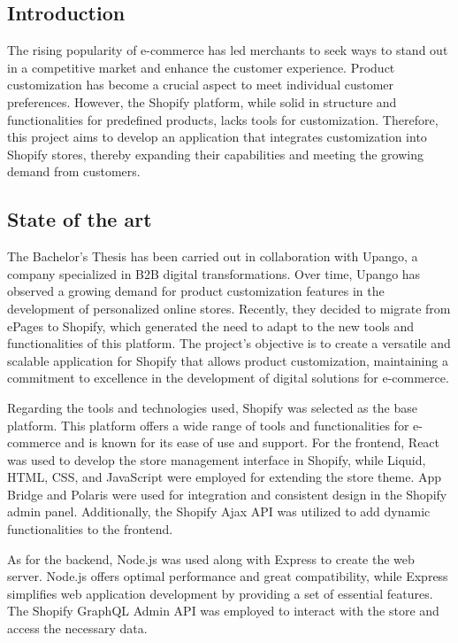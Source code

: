 \documentclass[12pt]{article}
\begin{document}
\subsection{Introduction}
The rising popularity of e-commerce has led merchants to seek ways to stand out in a competitive market and enhance the customer experience.
Product customization has become a crucial aspect to meet individual customer preferences. However, the Shopify platform, while solid in 
structure and functionalities for predefined products, lacks tools for customization. Therefore, this project aims to develop an application 
that integrates customization into Shopify stores, thereby expanding their capabilities and meeting the growing demand from customers.

\subsection{State of the art}
The Bachelor's Thesis has been carried out in collaboration with Upango, a company specialized in B2B digital transformations. Over time,
Upango has observed a growing demand for product customization features in the development of personalized online stores. Recently, they decided
to migrate from ePages to Shopify, which generated the need to adapt to the new tools and functionalities of this platform. The project's objective 
is to create a versatile and scalable application for Shopify that allows product customization, maintaining a commitment to excellence in the development
of digital solutions for e-commerce.

Regarding the tools and technologies used, Shopify was selected as the base platform. This platform offers a wide range of tools and functionalities 
for e-commerce and is known for its ease of use and support. For the frontend, React was used to develop the store management interface in Shopify, 
while Liquid, HTML, CSS, and JavaScript were employed for extending the store theme. App Bridge and Polaris were used for integration and consistent 
design in the Shopify admin panel. Additionally, the Shopify Ajax API was utilized to add dynamic functionalities to the frontend.

As for the backend, Node.js was used along with Express to create the web server. Node.js offers optimal performance and great compatibility, 
while Express simplifies web application development by providing a set of essential features. The Shopify GraphQL Admin API was employed to 
interact with the store and access the necessary data.
\end{document}
